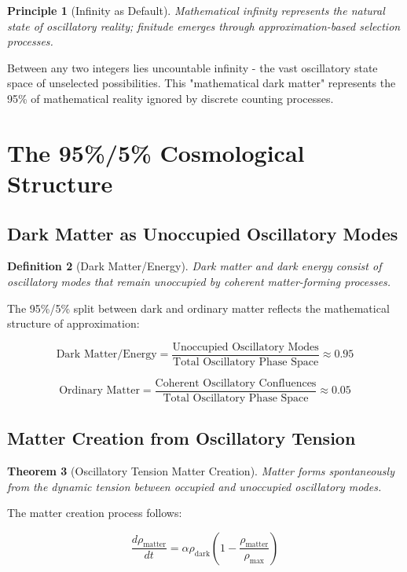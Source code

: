 \documentclass[11pt]{article}
\newtheorem{theorem}{Theorem}[section]
\newtheorem{definition}[theorem]{Definition}
\newtheorem{principle}[theorem]{Principle}
\theoremstyle{remark}
\begin{document}
\begin{principle}[Infinity as Default]
Mathematical infinity represents the natural state of oscillatory reality; finitude emerges through approximation-based selection processes.
\end{principle}

Between any two integers lies uncountable infinity - the vast oscillatory state space of unselected possibilities. This "mathematical dark matter" represents the 95\% of mathematical reality ignored by discrete counting processes.

\section{The 95\%/5\% Cosmological Structure}

\subsection{Dark Matter as Unoccupied Oscillatory Modes}

\begin{definition}[Dark Matter/Energy]
Dark matter and dark energy consist of oscillatory modes that remain unoccupied by coherent matter-forming processes.
\end{definition}

The 95\%/5\% split between dark and ordinary matter reflects the mathematical structure of approximation:

$$\text{Dark Matter/Energy} = \frac{\text{Unoccupied Oscillatory Modes}}{\text{Total Oscillatory Phase Space}} \approx 0.95$$

$$\text{Ordinary Matter} = \frac{\text{Coherent Oscillatory Confluences}}{\text{Total Oscillatory Phase Space}} \approx 0.05$$

\subsection{Matter Creation from Oscillatory Tension}

\begin{theorem}[Oscillatory Tension Matter Creation]
Matter forms spontaneously from the dynamic tension between occupied and unoccupied oscillatory modes.
\end{theorem}

The matter creation process follows:

$$\frac{d\rho_{\text{matter}}}{dt} = \alpha \rho_{\text{dark}} \left(1 - \frac{\rho_{\text{matter}}}{\rho_{\text{max}}}\right)$$
\end{document}
